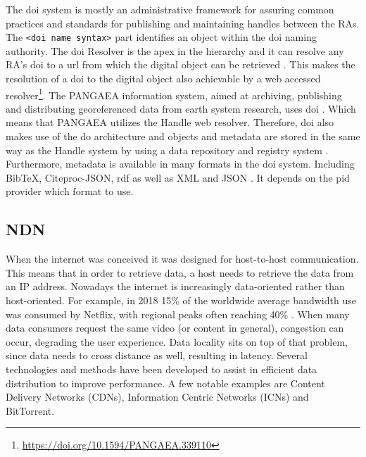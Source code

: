 The \gls{doi} system is mostly an administrative framework for assuring common practices and standards for publishing and maintaining handles between the RAs. 
The \texttt{<doi name syntax>} part identifies an object within the \gls{doi} naming authority. The \gls{doi} Resolver is the apex in the hierarchy and it can resolve any RA's \gls{doi} to a \gls{url} from which the digital object can be retrieved \cite{icn-bd}. This makes the resolution of a \gls{doi} to the digital object also achievable by a web accessed resolver\footnote{\url{https://doi.org/10.1594/PANGAEA.339110}}. The PANGAEA information system, aimed at archiving, publishing and distributing georeferenced data from earth system research, uses \gls{doi} \cite{pang}. Which means that PANGAEA utilizes the Handle web resolver. Therefore, \gls{doi} also makes use of the \gls{do} architecture and objects and metadata are stored in the same way as the Handle system by using a data repository and registry system \cite{dona-2}.
Furthermore, metadata is available in many formats in the \gls{doi} system. Including BibTeX, Citeproc-JSON, \gls{rdf} as well as XML and JSON \cite{doi-met}. It depends on the \gls{pid} provider which format to use.

\subsection{NDN}
\label{introduction-ndn}
When the internet was conceived it was designed for host-to-host communication. This means that in order to retrieve data, a host needs to retrieve the data from an IP address. Nowadays the internet is increasingly data-oriented rather than host-oriented. For example, in 2018 15\% of the worldwide average bandwidth use was consumed by Netflix, with regional peaks often reaching 40\% \cite{introduction-netflix}. When many data consumers request the same video (or content in general), congestion can occur, degrading the user experience. Data locality sits on top of that problem, since data needs to cross distance as well, resulting in latency. Several technologies and methods have been developed to assist in efficient data distribution to improve performance. A few notable examples are Content Delivery Networks (CDNs), Information Centric Networks (ICNs) and BitTorrent.

